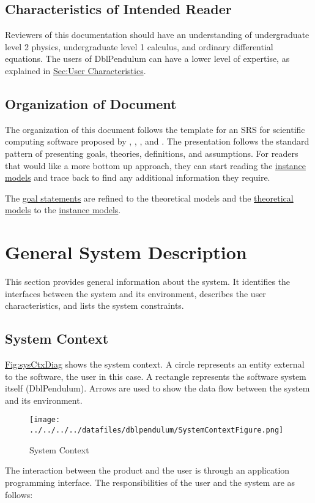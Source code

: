 \documentclass[12pt]{article}
\begin{document}
\subsection{Characteristics of Intended Reader}
\label{Sec:ReaderChars}
Reviewers of this documentation should have an understanding of undergraduate level 2 physics, undergraduate level 1 calculus, and ordinary differential equations. The users of DblPendulum can have a lower level of expertise, as explained in \hyperref[Sec:UserChars]{Sec:User Characteristics}.

\subsection{Organization of Document}
\label{Sec:DocOrg}
The organization of this document follows the template for an SRS for scientific computing software proposed by \cite{koothoor2013}, \cite{smithLai2005}, \cite{smithEtAl2007}, and \cite{smithKoothoor2016}. The presentation follows the standard pattern of presenting goals, theories, definitions, and assumptions. For readers that would like a more bottom up approach, they can start reading the \hyperref[Sec:IMs]{instance models} and trace back to find any additional information they require.

The \hyperref[Sec:GoalStmt]{goal statements} are refined to the theoretical models and the \hyperref[Sec:TMs]{theoretical models} to the \hyperref[Sec:IMs]{instance models}.

\section{General System Description}
\label{Sec:GenSysDesc}
This section provides general information about the system. It identifies the interfaces between the system and its environment, describes the user characteristics, and lists the system constraints.

\subsection{System Context}
\label{Sec:SysContext}
\hyperref[Figure:sysCtxDiag]{Fig:sysCtxDiag} shows the system context. A circle represents an entity external to the software, the user in this case. A rectangle represents the software system itself (DblPendulum). Arrows are used to show the data flow between the system and its environment.

\begin{figure}
\begin{center}
\texttt{[image: ../../../../datafiles/dblpendulum/SystemContextFigure.png]}
\caption{System Context}
\label{Figure:sysCtxDiag}
\end{center}
\end{figure}
The interaction between the product and the user is through an application programming interface. The responsibilities of the user and the system are as follows:
\end{document}
